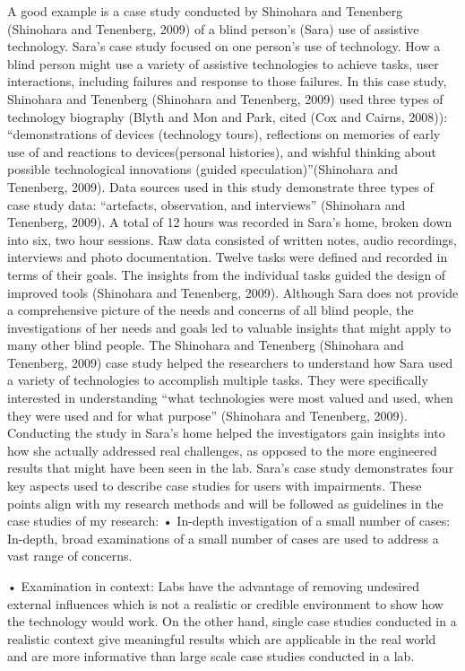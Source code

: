 A good example is a case study conducted by Shinohara and Tenenberg (Shinohara and Tenenberg, 2009) of a blind person’s (Sara) use of assistive technology. Sara’s case study focused on one person’s use of technology. How a blind person might use a variety of assistive technologies to achieve tasks, user interactions, including failures and response to those failures.
In this case study, Shinohara and Tenenberg (Shinohara and Tenenberg, 2009) used three types of technology biography (Blyth and Mon and Park, cited (Cox and Cairns, 2008)): “demonstrations of devices (technology tours), reflections on memories of early use of and reactions to devices(personal histories), and wishful thinking about possible technological innovations (guided speculation)”(Shinohara and Tenenberg, 2009). Data sources used in this study demonstrate three types of case study data: “artefacts, observation, and interviews” (Shinohara and Tenenberg, 2009).
A total of 12 hours was recorded in Sara’s home, broken down into six, two hour sessions.  Raw data consisted of written notes, audio recordings, interviews and photo documentation.  Twelve tasks were defined and recorded in terms of their goals.  The insights from the individual tasks guided the design of improved tools (Shinohara and Tenenberg, 2009).
Although Sara does not provide a comprehensive picture of the needs and concerns of all blind people, the investigations of her needs and goals led to valuable insights that might apply to many other blind people.  The Shinohara and Tenenberg (Shinohara and Tenenberg, 2009) case study helped the researchers to understand how Sara used a variety of technologies to accomplish multiple tasks.  They were specifically interested in understanding “what technologies were most valued and used, when they were used and for what purpose” (Shinohara and Tenenberg, 2009). Conducting the study in Sara’s home helped the investigators gain insights into how she actually addressed real challenges, as opposed to the more engineered results that might have been seen in the lab.  
Sara’s case study demonstrates four key aspects used to describe case studies for users with impairments.  These points align with my research methods and will be followed as guidelines in the case studies of my research:
•	In-depth investigation of a small number of cases: In-depth, broad examinations of a small number of cases are used to address a vast range of concerns.  

•	Examination in context: Labs have the advantage of removing undesired external influences which is not a realistic or credible environment to show how the technology would work. On the other hand, single case studies conducted in a realistic context give meaningful results which are applicable in the real world and are more informative than large scale case studies conducted in a lab.

